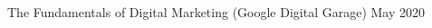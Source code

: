 \begin{CJK}{UTF8}{min}
The Fundamentals of Digital Marketing (Google Digital Garage) \hfill May 2020\\

\end{CJK}

